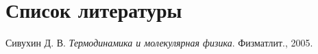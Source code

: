\section{Список литературы}

\begin{thebibliography}{15}
Сивухин Д. В. \emph{Термодинамика и молекулярная физика}. Физматлит., 2005.
\end{thebibliography}